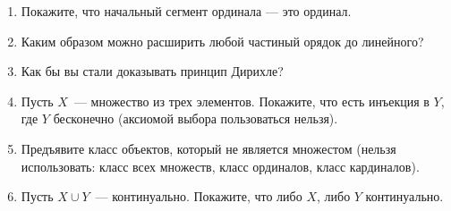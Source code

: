 
\usepackage{dashrule}

\renewcommand{\coursetitle}{\textsc{StT}}





\begin{enumerate}
    \item Покажите, что начальный сегмент ординала --- это ординал.
    \item Каким образом можно расширить любой частиный орядок до линейного?
    \item Как бы вы стали доказывать принцип Дирихле?
    \item Пусть $X$~--- множество из трех элементов. Покажите, что есть инъекция в $Y$, где $Y$
        бесконечно (аксиомой выбора пользоваться нельзя).
    \item Предъявите класс объектов, который не является множестом (нельзя использовать: класс всех
        множеств, класс ординалов, класс кардиналов).
    \item Пусть $X \cup Y$~--- континуально. Покажите, что либо $X$, либо $Y$ континуально.
\end{enumerate}




